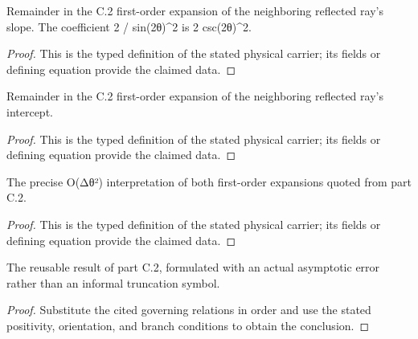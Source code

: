 \begin{definition}
  \label{def:physics:IPhO_2026_2_C_3:aux018}
  Remainder in the C.2 first-order expansion of the neighboring reflected ray's slope. The coefficient 2 / sin(2θ)\textasciicircum{}2 is 2 csc(2θ)\textasciicircum{}2.
\end{definition}
\begin{proof}
  This is the typed definition of the stated physical carrier; its fields or defining equation provide the claimed data.
\end{proof}

\begin{definition}
  \label{def:physics:IPhO_2026_2_C_3:aux019}
  Remainder in the C.2 first-order expansion of the neighboring reflected ray's intercept.
\end{definition}
\begin{proof}
  This is the typed definition of the stated physical carrier; its fields or defining equation provide the claimed data.
\end{proof}

\begin{definition}
  \label{def:physics:IPhO_2026_2_C_3:aux020}
  The precise O(Δθ²) interpretation of both first-order expansions quoted from part C.2.
\end{definition}
\begin{proof}
  This is the typed definition of the stated physical carrier; its fields or defining equation provide the claimed data.
\end{proof}

\begin{lemma}
  \label{lem:physics:IPhO_2026_2_C_3:aux021}
  The reusable result of part C.2, formulated with an actual asymptotic error rather than an informal truncation symbol.
\end{lemma}
\begin{proof}
  Substitute the cited governing relations in order and use the stated positivity, orientation, and branch conditions to obtain the conclusion.
\end{proof}

